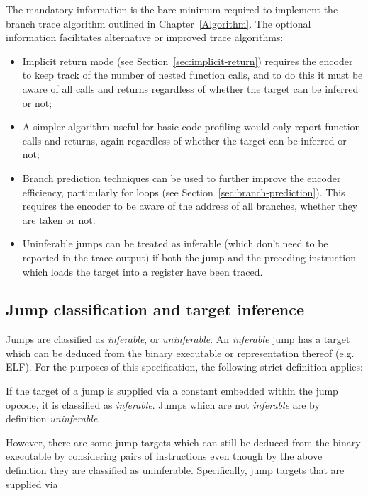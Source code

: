 The mandatory information is the bare-minimum required to implement the branch trace algorithm outlined in Chapter~\ref{Algorithm}.  
The optional information facilitates alternative or improved trace algorithms:

\begin{itemize}
  \item Implicit return mode (see Section~\ref{sec:implicit-return}) requires the encoder to keep track of the number of nested 
    function calls, and to do this it must be aware of all calls and returns regardless of whether the target can be inferred or not;
  \item A simpler algorithm useful for basic code profiling would only report function calls and returns, again 
    regardless of whether the target can be inferred or not;
  \item Branch prediction techniques can be used to further improve the encoder efficiency, particularly for loops 
    (see Section~\ref{sec:branch-prediction}).  This requires the encoder to be aware of the address of all branches, whether
    they are taken or not.
  \item Uninferable jumps can be treated as inferable (which don't need to be reported in the trace output) if both the jump 
    and the preceding instruction which loads the target into a register have been traced.
\end{itemize}

\subsection{Jump classification and target inference} \label{Jump Classes}

Jumps are classified as \textit{inferable}, or \textit{uninferable}.  An \textit{inferable} jump has a target which can be
deduced from the binary executable or representation thereof (e.g. ELF).  For the purposes of this specification, the following 
strict definition applies:

If the target of a jump is supplied via a constant embedded within the jump opcode, it is classified as \textit{inferable}.
Jumps which are not \textit{inferable} are by definition \textit{uninferable}.

However, there are some jump targets which can still be deduced from the binary executable by considering pairs of instructions
even though by the above definition they are classified as uninferable.  Specifically, jump targets that are supplied via

